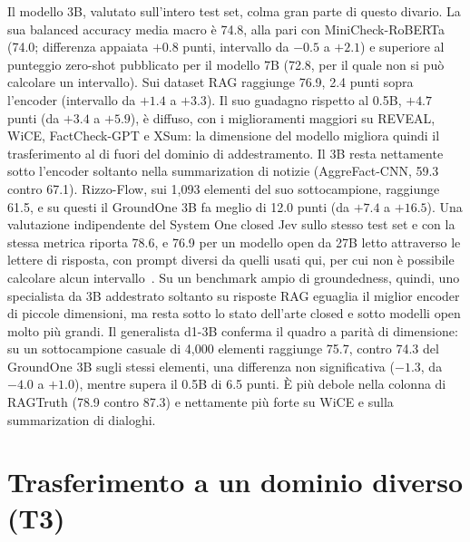 Il modello 3B, valutato sull'intero test set, colma gran parte di questo divario. La sua balanced accuracy media macro
è 74.8, alla pari con MiniCheck-RoBERTa (74.0; differenza appaiata $+0.8$ punti, intervallo da $-0.5$ a $+2.1$) e
superiore al punteggio zero-shot pubblicato per il modello 7B (72.8, per il quale non si può calcolare un intervallo).
Sui dataset RAG raggiunge 76.9, 2.4 punti sopra l'encoder (intervallo da $+1.4$ a $+3.3$). Il suo guadagno rispetto al
0.5B, $+4.7$ punti (da $+3.4$ a $+5.9$), è diffuso, con i miglioramenti maggiori su REVEAL, WiCE, FactCheck-GPT e XSum:
la dimensione del modello migliora quindi il trasferimento al di fuori del dominio di addestramento. Il 3B resta
nettamente sotto l'encoder soltanto nella summarization di notizie (AggreFact-CNN, 59.3 contro 67.1). Rizzo-Flow, sui
1{,}093 elementi del suo sottocampione, raggiunge 61.5, e su questi il GroundOne 3B fa meglio di 12.0 punti (da $+7.4$ a
$+16.5$). Una valutazione indipendente del System One closed Jev sullo stesso test set e con la stessa metrica riporta
78.6, e 76.9 per un modello open da 27B letto attraverso le lettere di risposta, con prompt diversi da quelli usati qui,
per cui non è possibile calcolare alcun intervallo~\cite{deusser2026jev}. Su un benchmark ampio di groundedness, quindi,
uno specialista da 3B addestrato soltanto su risposte RAG eguaglia il miglior encoder di piccole dimensioni, ma resta
sotto lo stato dell'arte closed e sotto modelli open molto più grandi. Il generalista d1-3B conferma il quadro a parità di
dimensione: su un sottocampione casuale di 4{,}000 elementi raggiunge 75.7, contro 74.3 del GroundOne 3B sugli stessi
elementi, una differenza non significativa ($-1.3$, da $-4.0$ a $+1.0$), mentre supera il 0.5B di 6.5 punti. È più
debole nella colonna di RAGTruth (78.9 contro 87.3) e nettamente più forte su WiCE e sulla summarization di dialoghi.

\section{Trasferimento a un dominio diverso (T3)}
\label{sec:results-t3}

